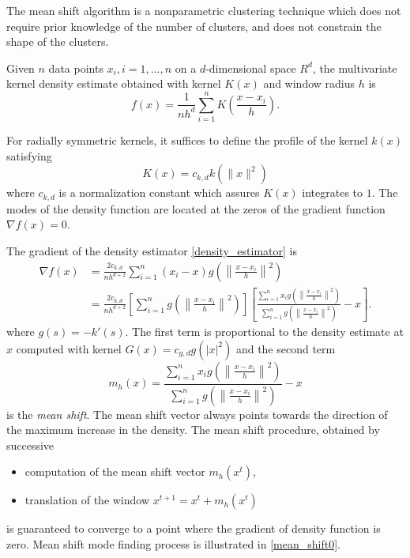 
The mean shift algorithm is a nonparametric clustering technique which does not
require prior knowledge of the number of clusters, and does not constrain the
shape of the clusters. 

Given $n$ data points $x_i, i = 1, ... , n$ on a
$d$-dimensional space $R^d$, the multivariate kernel density estimate obtained
with kernel $K(x)$ and window radius $h$ is
\begin{equation}\label{density_estimator}
	f(x)=\frac{1}{nh^d}\sum_{i=1}^n K(\frac{x-x_i}{h}).
\end{equation}

For radially symmetric kernels, it suffices to define the profile of the kernel
$k(x)$ satisfying
\begin{equation}
	K(x)=c_{k,d}k(\lVert x \rVert^2)
\end{equation}
where $c_{k,d}$ is a normalization constant which assures $K(x)$ integrates to 
$1$. The modes of the density function are located at the zeros of the gradient
function  $\nabla f(x) = 0$.

The gradient of the density estimator \eqref{density_estimator} is 
\begin{equation}
	\begin{split}
		\nabla f(x) & = \frac{2c_{k,d}}{nh^{d+2}}\sum_{i=1}^n \left(x_i - x\right)g\left(\left\lVert \frac{x - x_i}{h} \right\rVert^2\right) \\
		& = \frac{2c_{k,d}}{nh^{d+2}} \left[ \sum_{i=1}^n g\left(\left\lVert \frac{x - x_i}{h} \right\rVert^2\right) \right]
		\left[ \frac{\sum_{i=1}^n x_i g\left(\left\lVert \frac{x - x_i}{h} \right\rVert^2\right)}{\sum_{i=1}^n g\left(\left\lVert \frac{x - x_i}{h} \right\rVert^2\right)} -x \right].
	\end{split}
\end{equation}
where $g(s) = -k'(s)$. The first term is proportional to the density estimate at
$x$ computed with kernel $G(x) = c_{g,d}g(\lvert x \rvert^2)$ and the second 
term
\begin{equation}
	m_h(x) = \frac{\sum_{i=1}^n x_i g\left(\left\lVert \frac{x - x_i}{h} \right\rVert^2\right)}{\sum_{i=1}^n g\left(\left\lVert \frac{x - x_i}{h} \right\rVert^2\right)} -x
\end{equation}
is the \emph{mean shift}. The mean shift vector always points towards the direction of the maximum increase in the density. The mean shift procedure, obtained by successive
\begin{itemize}
	\item computation of the mean shift vector $m_h(x^t)$,
	\item translation of the window $x^{t+1} = x^t + m_h(x^t)$
\end{itemize}
is guaranteed to converge to a point where the gradient of density function is
zero. Mean shift mode finding process is illustrated in \ref{mean_shift0}.

